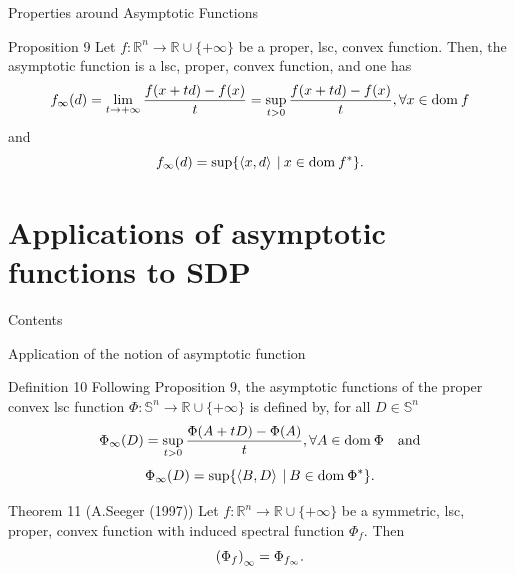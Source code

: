 \documentclass[aspectratio=169, dvipdfmx, 11pt]{beamer} %
\newcommand{\RealNumberSet}{\mathbb{R}}
\newcommand{\NDemenstionalRealEuclideanSpace}{\mathbb{R}^n}
\newcommand{\NDemenstionalRealSymmetricMatrixSpace}{\mathbb{S}^n}
\newcommand{\Domain}[1]{\text{\rm dom\:${#1}$}} %
\newcommand{\InnerProduct}[2]{\left\langle {#1},{#2}\right\rangle} %
\newcommand{\ExtendedRealValuedFunction}[2]{{#1}: {#2} \to \RealNumberSet \cup \{+\infty\}}
\newcommand{\ConjugateFunction}[1]{{#1}^*}
\begin{document}
\begin{frame}{Properties around Asymptotic Functions}
  \begin{block}{Proposition 9}
    Let $\ExtendedRealValuedFunction{f}{\NDemenstionalRealEuclideanSpace}$ be a proper, lsc, convex function. Then, the asymptotic function is a lsc, proper, convex function, and one has
    \begin{equation}
      f_{\infty} (d) = \lim_{t \to +\infty} \frac{f(x+td) -f(x)}{t} = \sup_{t > 0} \frac{f(x+td) -f(x)}{t}, \forall x \in \Domain{f} \notag
    \end{equation}
    and
    \begin{equation}
      f_{\infty} (d) = \sup \{\InnerProduct{x}{d} \:|\: x \in \Domain{\ConjugateFunction{f}}\}. \notag
    \end{equation}
  \end{block}
\end{frame}

\section{Applications of asymptotic functions to SDP}
\begin{frame}{Contents}
  \tableofcontents[currentsection]
\end{frame}

\begin{frame}{Application of the notion of asymptotic function}
  \begin{block}{Definition 10}
    Following Proposition 9, the asymptotic functions of the proper convex lsc function $\ExtendedRealValuedFunction{\Phi}{\NDemenstionalRealSymmetricMatrixSpace}$ is defined by, for all $D \in \NDemenstionalRealSymmetricMatrixSpace$
    \begin{equation}
      \Phi_{\infty} (D) = \sup_{t > 0} \frac{\Phi(A+tD) -\Phi(A)}{t}, \forall A \in \Domain{\Phi} \quad \text{and}\notag
    \end{equation}
    \begin{equation}
      \Phi_{\infty} (D) = \sup \{\InnerProduct{B}{D} \:|\: B \in \Domain{\ConjugateFunction{\Phi}}\}. \notag
    \end{equation}
  \end{block}

  \begin{block}{Theorem 11 (A.Seeger (1997))}
    Let $\ExtendedRealValuedFunction{f}{\NDemenstionalRealEuclideanSpace}$ be a symmetric, lsc, proper, convex function with induced spectral function $\Phi_{f}$. Then
    \begin{equation}
      {(\Phi_{f})}_{\infty} = \Phi_{f_{\infty}}. \notag
    \end{equation}
  \end{block}
\end{frame}
\end{document}
